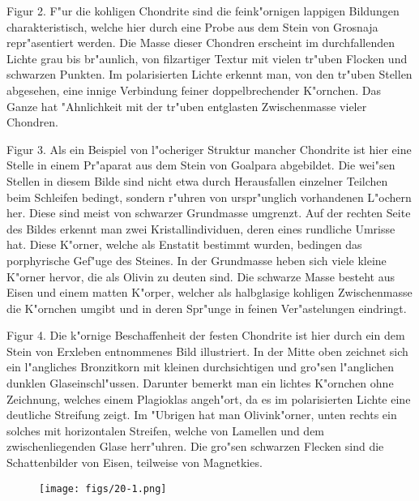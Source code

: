 \documentclass[a4paper, 11pt, oneside, polutonikogreek, german]{article}
\begin{document}
Figur 2. F"ur die kohligen Chondrite sind die feink"ornigen lappigen Bildungen charakteristisch, welche hier durch eine Probe aus dem Stein von Grosnaja repr"asentiert werden. Die Masse dieser Chondren erscheint im durchfallenden Lichte grau bis br"aunlich, von filzartiger Textur mit vielen tr"uben Flocken und schwarzen Punkten. Im polarisierten Lichte erkennt man, von den tr"uben Stellen abgesehen, eine innige Verbindung feiner doppelbrechender K"ornchen. Das Ganze hat "Ahnlichkeit mit der tr"uben entglasten Zwischenmasse vieler Chondren.

Figur 3. Als ein Beispiel von l"ocheriger Struktur mancher Chondrite ist hier eine Stelle in einem Pr"aparat aus dem Stein von Goalpara abgebildet. Die wei"sen Stellen in diesem Bilde sind nicht etwa durch Herausfallen einzelner Teilchen beim Schleifen bedingt, sondern r"uhren von urspr"unglich vorhandenen L"ochern her. Diese sind meist von schwarzer Grundmasse umgrenzt. Auf der rechten Seite des Bildes erkennt man zwei Kristallindividuen, deren eines rundliche Umrisse hat. Diese K"orner, welche als Enstatit bestimmt wurden, bedingen das porphyrische Gef"uge des Steines. In der Grundmasse heben sich viele kleine K"orner hervor, die als Olivin zu deuten sind. Die schwarze Masse besteht aus Eisen und einem matten K"orper, welcher als halbglasige kohligen Zwischenmasse die K"ornchen umgibt und in deren Spr"unge in feinen Ver"astelungen eindringt.

Figur 4. Die k"ornige Beschaffenheit der festen Chondrite ist hier durch ein dem Stein von Erxleben entnommenes Bild illustriert. In der Mitte oben zeichnet sich ein l"angliches Bronzitkorn mit kleinen durchsichtigen und gro"sen l"anglichen dunklen Glaseinschl"ussen. Darunter bemerkt man ein lichtes K"ornchen ohne Zeichnung, welches einem Plagioklas angeh"ort, da es im polarisierten Lichte eine deutliche Streifung zeigt. Im "Ubrigen hat man Olivink"orner, unten rechts ein solches mit horizontalen Streifen, welche von Lamellen und dem zwischenliegenden Glase herr"uhren. Die gro"sen schwarzen Flecken sind die Schattenbilder von Eisen, teilweise von Magnetkies.
\clearpage

\vspace*{\fill}
\begin{figure}[H]
\centering
\texttt{[image: figs/20-1.png]}
\caption{}
\end{figure}
\vspace*{\fill}
\clearpage
\end{document}
